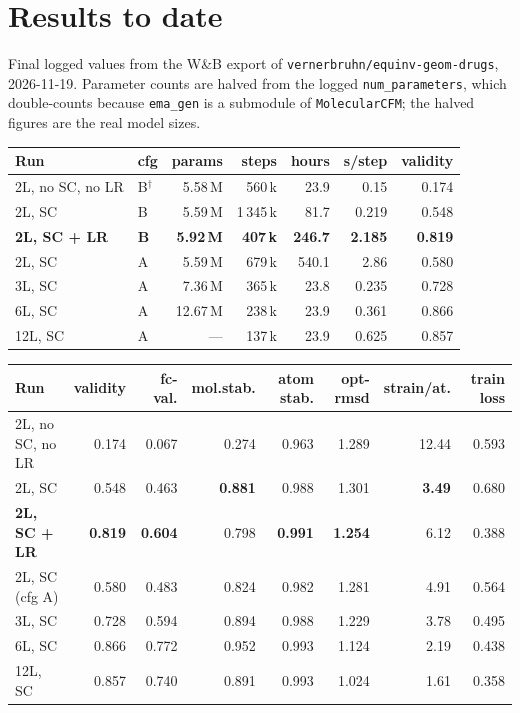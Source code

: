 \documentclass[11pt,a4paper]{article}
\newcommand{\code}[1]{\texttt{#1}}
\begin{document}
\section{Results to date}\label{sec:results}

Final logged values from the W\&B export of \code{vernerbruhn/equinv-geom-drugs},
2026-11-19. Parameter counts are halved from the logged \code{num\_parameters}, which
double-counts because \code{ema\_gen} is a submodule of \code{MolecularCFM}; the halved
figures are the real model sizes.

\begin{center}\small
\begin{tabular}{llrrrrr}
\toprule
Run & cfg & params & steps & hours & s/step & validity \\
\midrule
2L, no SC, no LR        & B$^\dagger$ & 5.58\,M & 560\,k & 23.9 & 0.15 & 0.174 \\
2L, SC                  & B & 5.59\,M & 1\,345\,k & 81.7 & 0.219 & 0.548 \\
\textbf{2L, SC + LR}    & \textbf{B} & \textbf{5.92\,M} & \textbf{407\,k} & \textbf{246.7} & \textbf{2.185} & \textbf{0.819} \\
\midrule
2L, SC                  & A & 5.59\,M & 679\,k & 540.1 & 2.86 & 0.580 \\
3L, SC                  & A & 7.36\,M & 365\,k & 23.8 & 0.235 & 0.728 \\
6L, SC                  & A & 12.67\,M & 238\,k & 23.9 & 0.361 & 0.866 \\
12L, SC                 & A & --- & 137\,k & 23.9 & 0.625 & 0.857 \\
\bottomrule
\end{tabular}

\smallskip
\begin{tabular}{lrrrrrrr}
\toprule
Run & validity & fc-val. & mol.stab. & atom stab. & opt-rmsd & strain/at. & train loss \\
\midrule
2L, no SC, no LR     & 0.174 & 0.067 & 0.274 & 0.963 & 1.289 & 12.44 & 0.593 \\
2L, SC               & 0.548 & 0.463 & \textbf{0.881} & 0.988 & 1.301 & \textbf{3.49} & 0.680 \\
\textbf{2L, SC + LR} & \textbf{0.819} & \textbf{0.604} & 0.798 & \textbf{0.991} & \textbf{1.254} & 6.12 & 0.388 \\
\midrule
2L, SC (cfg A)       & 0.580 & 0.483 & 0.824 & 0.982 & 1.281 & 4.91 & 0.564 \\
3L, SC               & 0.728 & 0.594 & 0.894 & 0.988 & 1.229 & 3.78 & 0.495 \\
6L, SC               & 0.866 & 0.772 & 0.952 & 0.993 & 1.124 & 2.19 & 0.438 \\
12L, SC              & 0.857 & 0.740 & 0.891 & 0.993 & 1.024 & 1.61 & 0.358 \\
\bottomrule
\end{tabular}
\end{center}
\end{document}
